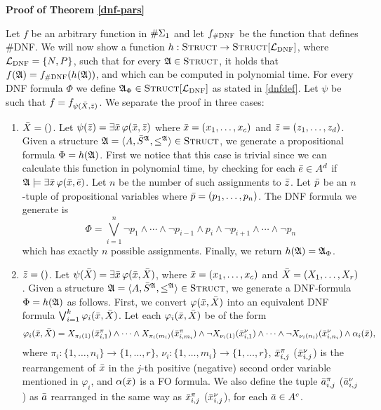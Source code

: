 \textbf{Proof of Theorem \ref{dnf-pars}}

Let $f$ be an arbitrary function in $\#\Sigma_{1}$ and let $f_{\textsc{\#DNF}}$ be the function that defines {\sc \#DNF}. We will now show a function $h:\str\to \textsc{Struct}[\L_{\textsc{DNF}}]$, where $\L_{\textsc{DNF}} = \{N,P\}$, such that for every $\mathfrak{A}\in\text{\sc Struct}$, it holds that $f(\mathfrak{A}) = f_{\textsc{\#DNF}}(h(\mathfrak{A}))$, and which can be computed in polynomial time. For every DNF formula $\Phi$ we define $\A_{\Phi} \in \textsc{Struct}[\L_{\textsc{DNF}}]$ as stated in \ref{dnfdef}. Let $\psi$ be such that $f = f_{\psi(\bar{X},\bar{z})}$. We separate the proof in three cases:
\begin{enumerate}
	\item $\bar{X} = ()$. Let $\psi(\bar{z}) = \exists \bar{x}\,\varphi(\bar{x},\bar{z})$ where $\bar{x} = (x_1,\ldots,x_c)$ and $\bar{z} = (z_1,\ldots,z_d)$. Given a structure $\mathfrak{A} = \langle A, \bar{S}^{\mathfrak{A}}, \leq^{\mathfrak{A}} \rangle\in\text{\sc Struct}$, we generate a propositional formula $\Phi = h(\mathfrak{A})$. First we notice that this case is trivial since we can calculate this function in polynomial time, by checking for each $\bar{e}\in A^d$ if $\mathfrak{A}\models\exists\bar{x}\,\varphi(\bar{x},\bar{e})$. Let $n$ be the number of such assignments to $\bar{z}$. Let $\bar{p}$ be an $n$-tuple of propositional variables where $\bar{p} = (p_1,\ldots,p_n)$. The DNF formula we generate is
	\[
	\Phi = \bigvee_{i = 1}^n \neg p_1 \wedge \cdots \wedge \neg p_{i-1} \wedge p_i \wedge \neg p_{i+1} \wedge \cdots \wedge \neg p_n
	\]
	which has exactly $n$ possible assignments. Finally, we return $h(\mathfrak{A}) = \mathfrak{A}_{\Phi}$.
	
	\item $\bar{z} = ()$. Let $\psi(\bar{X}) = \exists \bar{x}\,\varphi(\bar{x},\bar{X})$, where $\bar{x} = (x_1,\ldots,x_c)$ and $\bar{X} = (X_1,\ldots,X_r)$. Given a structure $\mathfrak{A} = \langle A, \bar{S}^{\mathfrak{A}}, \leq^{\mathfrak{A}} \rangle\in\text{\sc Struct}$, we generate a DNF-formula $\Phi = h(\mathfrak{A})$ as follows. First, we convert $\varphi(\bar{x},\bar{X})$ into an equivalent DNF formula $\bigvee_{i = 1}^k \varphi_{i}(\bar{x},\bar{X})$. Let each $\varphi_{i}(\bar{x},\bar{X})$ be of the form
	\[
	\varphi_{i}(\bar{x},\bar{X}) = X_{\pi_i(1)}(\bar{x}^{\pi}_{i,1}) \wedge \cdots \wedge X_{\pi_i(m_i)}(\bar{x}^{\pi}_{i,m_i}) \wedge \neg X_{\nu_i(1)}(\bar{x}^{\nu}_{i,1}) \wedge \cdots \wedge \neg X_{\nu_i(n_i)}(\bar{x}^{\nu}_{i,n_i}) \wedge \alpha_i(\bar{x}),
	\]
	where $\pi_i:\{1,\ldots,n_i\}\to\{1,\ldots,r\}$, $\nu_i:\{1,\ldots,m_i\}\to\{1,\ldots,r\}$, $\bar{x}^{\pi}_{i,j}$ ($\bar{x}^{\nu}_{i,j}$) is the rearrangement of $\bar{x}$ in the $j$-th positive (negative) second order variable mentioned in $\varphi_i$, and $\alpha(\bar{x})$ is a FO formula. We also define the tuple $\bar{a}^{\pi}_{i,j}$ ($\bar{a}^{\nu}_{i,j}$) as $\bar{a}$ rearranged in the same way as $\bar{x}^{\pi}_{i,j}$ ($\bar{x}^{\nu}_{i,j}$), for each $\bar{a}\in A^c$.
	

\end{enumerate}
